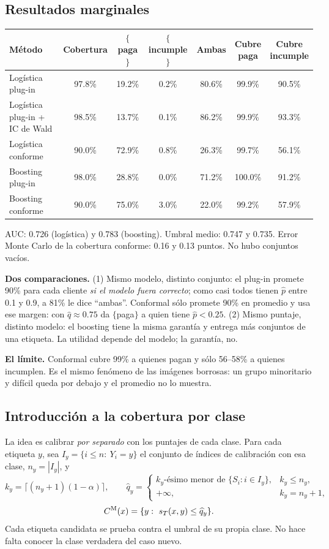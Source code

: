 \documentclass[11pt]{article}
\theoremstyle{plain}
\theoremstyle{definition}
\theoremstyle{remark}
\newcommand{\qhat}{\widehat q}
\newcommand{\phat}{\widehat p}
\newcommand{\dest}[1]{\par\needspace{4\baselineskip}\textbf{#1}\quad}
\newcommand{\lamina}[1]{}%
\begin{document}
\subsection{Resultados marginales}
\begin{center}
\small\setlength{\tabcolsep}{4pt}
\begin{tabular}{lcccccc}
\toprule
Método & Cobertura & $\{$paga$\}$ & $\{$incumple$\}$ & Ambas & \shortstack{Cubre\\paga} & \shortstack{Cubre\\incumple}\\
\midrule
Logística plug-in & 97.8\% & 19.2\% & 0.2\% & 80.6\% & 99.9\% & 90.5\%\\
Logística plug-in + IC de Wald & 98.5\% & 13.7\% & 0.1\% & 86.2\% & 99.9\% & 93.3\%\\
Logística conforme & 90.0\% & 72.9\% & 0.8\% & 26.3\% & 99.7\% & 56.1\%\\
Boosting plug-in & 98.0\% & 28.8\% & 0.0\% & 71.2\% & 100.0\% & 91.2\%\\
Boosting conforme & 90.0\% & 75.0\% & 3.0\% & 22.0\% & 99.2\% & 57.9\%\\
\bottomrule
\end{tabular}
\end{center}
AUC: 0.726 (logística) y 0.783 (boosting). Umbral medio: 0.747 y 0.735. Error Monte Carlo de la
cobertura conforme: 0.16 y 0.13 puntos. No hubo conjuntos vacíos.

\dest{Dos comparaciones.} (1) Mismo modelo, distinto conjunto: el plug-in promete 90\% para cada
cliente \emph{si el modelo fuera correcto}; como casi todos tienen $\phat$ entre 0.1 y 0.9, a 81\% le
dice ``ambas''. Conformal sólo promete 90\% en promedio y usa ese margen: con $\qhat\approx0.75$ da
$\{$paga$\}$ a quien tiene $\phat<0.25$. (2) Mismo puntaje, distinto modelo: el boosting tiene la
misma garantía y entrega más conjuntos de una etiqueta. La utilidad depende del modelo; la
garantía, no.

\dest{El límite.} Conformal cubre 99\% a quienes pagan y sólo 56--58\% a quienes incumplen. Es el
mismo fenómeno de las imágenes borrosas: un grupo minoritario y difícil queda por debajo y el
promedio no lo muestra.

\subsection{Introducción a la cobertura por clase}\label{sec:mondrian}\lamina{23}
La idea es calibrar \emph{por separado} con los puntajes de cada clase. Para cada etiqueta $y$, sea
$I_y=\{i\le n:\ Y_i=y\}$ el conjunto de índices de calibración con esa clase, $n_y=|I_y|$, y
\[
 k_y=\lceil(n_y+1)(1-\alpha)\rceil,\qquad
 \qhat_y=\begin{cases}\text{$k_y$-ésimo menor de }\{S_i: i\in I_y\},&k_y\le n_y,\\+\infty,&k_y=n_y+1,\end{cases}
\]
\[
 C^{\rm M}(x)=\{y:\ s_T(x,y)\le\qhat_y\}.
\]
Cada etiqueta candidata se prueba contra el umbral de su propia clase. No hace falta conocer la clase
verdadera del caso nuevo.
\end{document}
